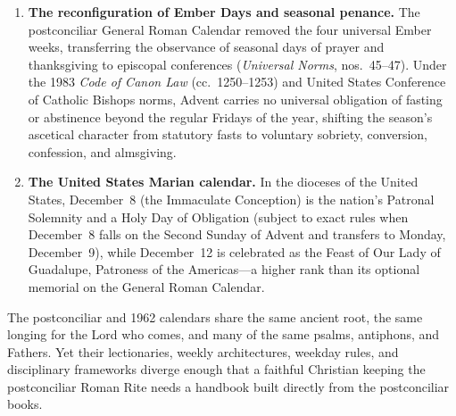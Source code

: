 \begin{enumerate}
  \item \textbf{The reconfiguration of Ember Days and seasonal penance.} The postconciliar General Roman Calendar removed the four universal Ember weeks, transferring the observance of seasonal days of prayer and thanksgiving to episcopal conferences (\textit{Universal Norms}, nos.~45--47). Under the 1983 \textit{Code of Canon Law} (cc.~1250--1253) and United States Conference of Catholic Bishops norms, Advent carries no universal obligation of fasting or abstinence beyond the regular Fridays of the year, shifting the season's ascetical character from statutory fasts to voluntary sobriety, conversion, confession, and almsgiving.
  \item \textbf{The United States Marian calendar.} In the dioceses of the United States, December~8 (the Immaculate Conception) is the nation's Patronal Solemnity and a Holy Day of Obligation (subject to exact rules when December~8 falls on the Second Sunday of Advent and transfers to Monday, December~9), while December~12 is celebrated as the Feast of Our Lady of Guadalupe, Patroness of the Americas---a higher rank than its optional memorial on the General Roman Calendar.
\end{enumerate}

The postconciliar and 1962 calendars share the same ancient root, the same longing for the Lord who comes, and many of the same psalms, antiphons, and Fathers. Yet their lectionaries, weekly architectures, weekday rules, and disciplinary frameworks diverge enough that a faithful Christian keeping the postconciliar Roman Rite needs a handbook built directly from the postconciliar books.
